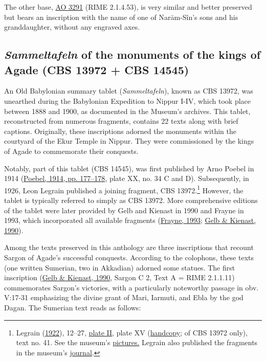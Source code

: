 \documentclass[
]{book}
\begin{document}
The other base, \href{https://collections.louvre.fr/en/ark:/53355/cl010121771}{AO 3291} (RIME 2.1.4.53), is very similar and better preserved but bears an inscription with the name of one of Narām-Sîn's sons and his granddaughter, without any engraved axes.

\hypertarget{sammeltafeln-of-the-monuments-of-the-kings-of-agade-cbs-13972-cbs-14545}{%
\subsection{\texorpdfstring{\emph{Sammeltafeln} of the monuments of the kings of Agade (CBS 13972 + CBS 14545)}{Sammeltafeln of the monuments of the kings of Agade (CBS 13972 + CBS 14545)}}\label{sammeltafeln-of-the-monuments-of-the-kings-of-agade-cbs-13972-cbs-14545}}

An Old Babylonian summary tablet (\emph{Sammeltafeln}), known as CBS 13972, was unearthed during the Babylonian Expedition to Nippur I-IV, which took place between 1888 and 1900, as documented in the Museum's archives. This tablet, reconstructed from numerous fragments, contains 22 texts along with brief captions. Originally, these inscriptions adorned the monuments within the courtyard of the Ekur Temple in Nippur. They were commissioned by the kings of Agade to commemorate their conquests.

Notably, part of this tablet (CBS 14545), was first published by Arno Poebel in 1914 (\protect\hyperlink{ref-Poebel1914}{Poebel, 1914, pp. 177--178}, plate XX, no. 34 C and D). Subsequently, in 1926, Leon Legrain published a joining fragment, CBS 13972.\footnote{Legrain (\protect\hyperlink{ref-Legrain1922}{1922}), 12--27, \href{https://archive.org/details/royalinscription00legr_0/page/55/mode/1up?view=theater}{plate II}, plate XV (\href{https://archive.org/details/royalinscription00legr_0/page/82/mode/1up}{handcopy}; of CBS 13972 only), text no. 41. See the museum's \href{https://www.penn.museum/collections/object_images.php?irn=347461}{pictures.} Legrain also published the fragments in the museum's \href{https://www.penn.museum/sites/journal/9818/}{journal}.} However, the tablet is typically referred to simply as CBS 13972. More comprehensive editions of the tablet were later provided by Gelb and Kienast in 1990 and Frayne in 1993, which incorporated all available fragments (\protect\hyperlink{ref-Frayne1993}{Frayne, 1993}; \protect\hyperlink{ref-GelbKienast1990}{Gelb \& Kienast, 1990}).

Among the texts preserved in this anthology are three inscriptions that recount Sargon of Agade's successful conquests. According to the colophons, these texts (one written Sumerian, two in Akkadian) adorned some statues. The first inscription (\protect\hyperlink{ref-GelbKienast1990}{Gelb \& Kienast, 1990}, Sargon C 2, Text A = RIME 2.1.1.11) commemorates Sargon's victories, with a particularly noteworthy passage in obv. V:17-31 emphasizing the divine grant of Mari, Iarmuti, and Ebla by the god Dagan. The Sumerian text reads as follows:
\end{document}

